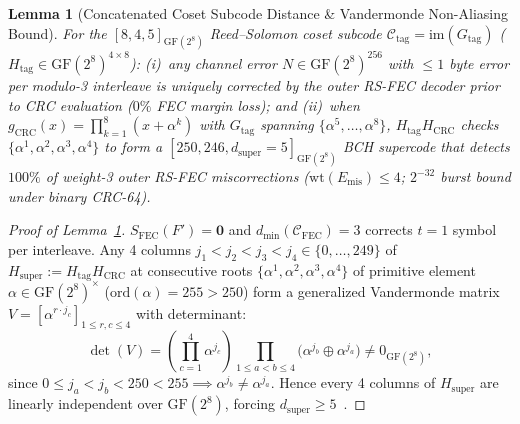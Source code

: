 \documentclass[10pt,twocolumn]{article}
\theoremstyle{spectralthm}
\newtheorem{lemma}[theorem]{Lemma}
\begin{document}
\begin{lemma}[Concatenated Coset Subcode Distance \& Vandermonde Non-Aliasing Bound]
\label{lem:bch}
For the $[8,4,5]_{\mathrm{GF}(2^8)}$ Reed--Solomon coset subcode $\mathcal{C}_{\mathrm{tag}} = \mathrm{im}(G_{\mathrm{tag}})$ ($H_{\mathrm{tag}} \in \mathrm{GF}(2^8)^{4 \times 8}$): (i)~any channel error $N \in \mathrm{GF}(2^8)^{256}$ with $\le 1$ byte error per modulo-3 interleave is uniquely corrected by the outer RS-FEC decoder prior to CRC evaluation ($0\%$ FEC margin loss); and (ii)~when $g_{\mathrm{CRC}}(x) = \prod_{k=1}^8 (x + \alpha^k)$ with $G_{\mathrm{tag}}$ spanning $\{\alpha^5,\ldots,\alpha^8\}$, $H_{\mathrm{tag}}H_{\mathrm{CRC}}$ checks $\{\alpha^1,\alpha^2,\alpha^3,\alpha^4\}$ to form a $[250, 246, d_{\mathrm{super}} = 5]_{\mathrm{GF}(2^8)}$ BCH supercode that detects $100\%$ of weight-3 outer RS-FEC miscorrections ($\mathrm{wt}(E_{\mathrm{mis}}) \le 4$; $2^{-32}$ burst bound under binary CRC-64).
\end{lemma}
\begin{proof}[Proof of Lemma~\ref{lem:bch}]
$S_{\mathrm{FEC}}(F') = \mathbf{0}$ and $d_{\min}(\mathcal{C}_{\mathrm{FEC}}) = 3$ corrects $t = 1$ symbol per interleave. Any 4 columns $j_1 < j_2 < j_3 < j_4 \in \{0,\ldots,249\}$ of $H_{\mathrm{super}} := H_{\mathrm{tag}}H_{\mathrm{CRC}}$ at consecutive roots $\{\alpha^1,\alpha^2,\alpha^3,\alpha^4\}$ of primitive element $\alpha \in \mathrm{GF}(2^8)^\times$ ($\mathrm{ord}(\alpha) = 255 > 250$) form a generalized Vandermonde matrix $V = [\alpha^{r \cdot j_c}]_{1 \le r, c \le 4}$ with determinant:
\begin{equation}
\label{eq:vandermonde_bch}
\det(V) = \left(\prod_{c=1}^4 \alpha^{j_c}\right) \prod_{1 \le a < b \le 4} \bigl(\alpha^{j_b} \oplus \alpha^{j_a}\bigr) \neq 0_{\mathrm{GF}(2^8)},
\end{equation}
since $0 \le j_a < j_b < 250 < 255 \implies \alpha^{j_b} \neq \alpha^{j_a}$. Hence every 4 columns of $H_{\mathrm{super}}$ are linearly independent over $\mathrm{GF}(2^8)$, forcing $d_{\mathrm{super}} \ge 5$~\cite{macwilliams1977theory}.
\end{proof}
\end{document}
